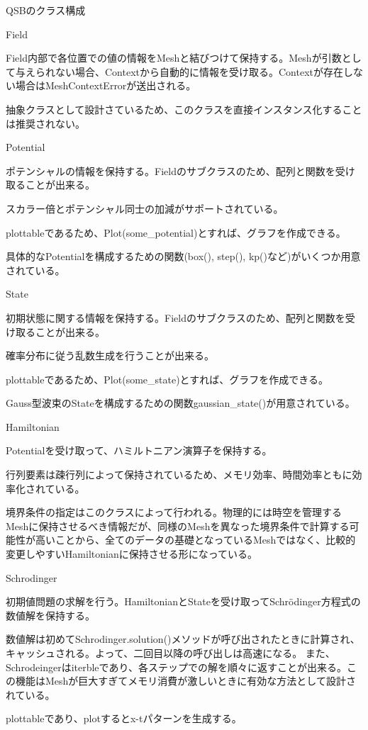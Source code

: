 \documentclass[a4paper, lualatex]{bxjsarticle}
\begin{document}
\begin{section}{QSBのクラス構成}
\begin{subsection}{Field}
        \par Field内部で各位置での値の情報をMeshと結びつけて保持する。Meshが引数として与えられない場合、Contextから自動的に情報を受け取る。Contextが存在しない場合はMeshContextErrorが送出される。
        \par 抽象クラスとして設計さているため、このクラスを直接インスタンス化することは推奨されない。
    \end{subsection}
    \begin{subsection}{Potential}
        \par ポテンシャルの情報を保持する。Fieldのサブクラスのため、配列と関数を受け取ることが出来る。
        \par スカラー倍とポテンシャル同士の加減がサポートされている。
        \par plottableであるため、Plot(some\_potential)とすれば、グラフを作成できる。
        \par 具体的なPotentialを構成するための関数(box(), step(), kp()など)がいくつか用意されている。
    \end{subsection}
    \begin{subsection}{State}
        \par 初期状態に関する情報を保持する。Fieldのサブクラスのため、配列と関数を受け取ることが出来る。
        \par 確率分布に従う乱数生成を行うことが出来る。
        \par plottableであるため、Plot(some\_state)とすれば、グラフを作成できる。
        \par Gauss型波束のStateを構成するための関数gaussian\_state()が用意されている。
    \end{subsection}
    \begin{subsection}{Hamiltonian}
        \par Potentialを受け取って、ハミルトニアン演算子を保持する。
        \par 行列要素は疎行列によって保持されているため、メモリ効率、時間効率ともに効率化されている。
        \par 境界条件の指定はこのクラスによって行われる。物理的には時空を管理するMeshに保持させるべき情報だが、同様のMeshを異なった境界条件で計算する可能性が高いことから、全てのデータの基礎となっているMeshではなく、比較的変更しやすいHamiltonianに保持させる形になっている。
    \end{subsection}
    \begin{subsection}{Schrodinger}
        \par 初期値問題の求解を行う。HamiltonianとStateを受け取ってSchrödinger方程式の数値解を保持する。
        \par 数値解は初めてSchrodinger.solution()メソッドが呼び出されたときに計算され、キャッシュされる。よって、二回目以降の呼び出しは高速になる。 また、Schrodeingerはiterbleであり、各ステップでの解を順々に返すことが出来る。この機能はMeshが巨大すぎてメモリ消費が激しいときに有効な方法として設計されている。
        \par plottableであり、plotするとx-tパターンを生成する。
    \end{subsection}
\end{section}
\end{document}
